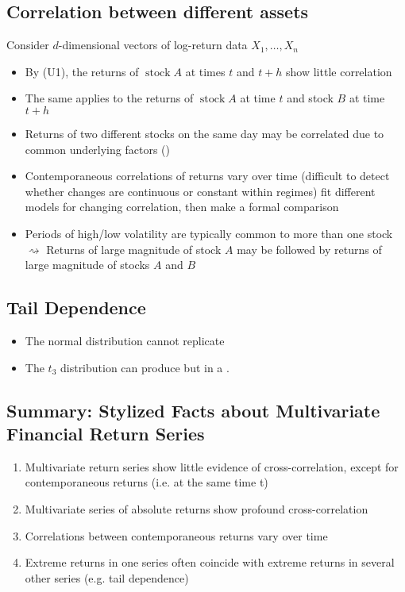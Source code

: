 \subsection*{Correlation between different assets}
Consider $d$-dimensional vectors of log-return data $X_{1}, \ldots, X_{n}$
\begin{itemize}[leftmargin=*]
    \item By (U1), the returns of $\operatorname{stock} A$ at times $t$ and $t+h$ show little correlation
    \item The same applies to the returns of $\operatorname{stock} A$ at time $t$ and stock $B$ at time $t+h$
    \item Returns of two different stocks on the same day may be correlated due to common underlying factors ()
    \item Contemporaneous correlations of returns vary over time (difficult to detect whether changes are continuous or constant within regimes)
fit different models for changing correlation, then make a formal comparison
    \item Periods of high/low volatility are typically common to more than one stock $\rightsquigarrow$ Returns of large magnitude of stock $A$ may be followed by returns of large magnitude of stocks $A$ and $B$
\end{itemize}



\subsection*{Tail Dependence}
\begin{itemize}[leftmargin=*]
    \item The normal distribution cannot replicate 
    \item The $t_{3}$ distribution can produce  but in a .
\end{itemize}



\subsection*{Summary: Stylized Facts about Multivariate Financial Return Series}
\begin{enumerate}[label = (M\arabic*), leftmargin=*]
    \item Multivariate return series show little evidence of cross-correlation, except for contemporaneous returns (i.e. at the same time t)
    \item Multivariate series of absolute returns show profound cross-correlation
    \item Correlations between contemporaneous returns vary over time
    \item Extreme returns in one series often coincide with extreme returns in several other series (e.g. tail dependence)

\end{enumerate}